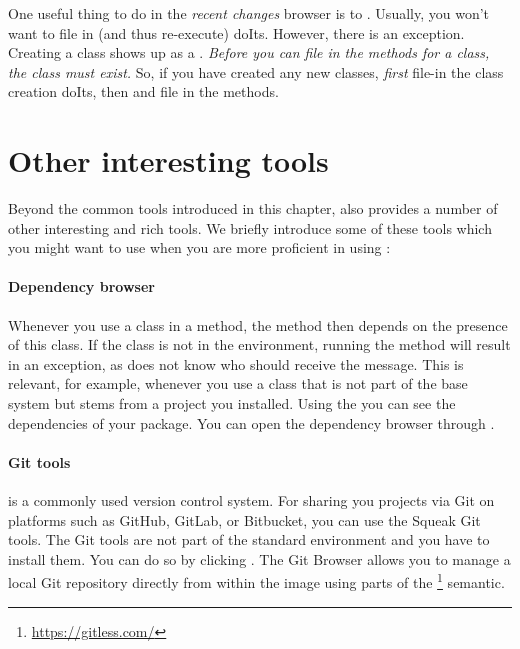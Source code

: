 \documentclass[a4paper,10pt,twoside]{book}
\begin{document}
One useful thing to do in the \emph{recent changes} browser is to .
Usually, you won't want to file in (and thus re-execute) doIts.
However, there is an exception.
Creating a class shows up as a .
\emph{Before you can file in the methods for a class, the class must exist.}
So, if you have created any new classes, \emph{first} file-in the class creation doIts, then  and file in the methods.


\section{Other interesting tools}
Beyond the common tools introduced in this chapter, \sq also provides a number of other interesting and rich tools.
We briefly introduce some of these tools which you might want to use when you are more proficient in using \sq:

\paragraph{Dependency browser}
Whenever you use a class in a method, the method then depends on the presence of this class.
If the class is not in the environment, running the method will result in an exception, as \sq does not know who should receive the message.
This is relevant, for example, whenever you use a class that is not part of the base system but stems from a project you installed.
Using the  you can see the dependencies of your package.
You can open the dependency browser through .

\paragraph{Git tools}
 is a commonly used version control system.
For sharing you projects via Git on platforms such as GitHub, GitLab, or Bitbucket, you can use the Squeak Git tools.
The Git tools are not part of the standard environment and you have to install them.
You can do so by clicking .
The Git Browser allows you to manage a local Git repository directly from within the image using parts of the \footnote{\url{https://gitless.com/}} semantic.
\end{document}
